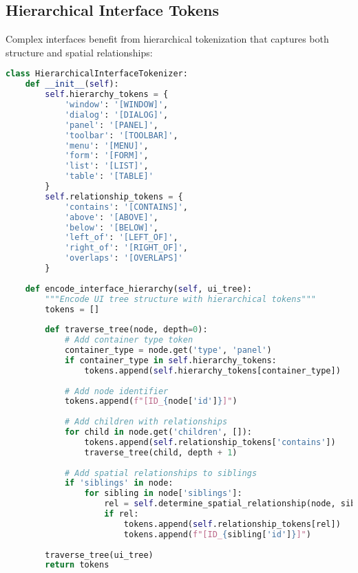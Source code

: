 \subsection{Hierarchical Interface Tokens}

Complex interfaces benefit from hierarchical tokenization that captures both structure and spatial relationships:

\begin{lstlisting}[language=Python, caption=Hierarchical interface tokenization]
class HierarchicalInterfaceTokenizer:
    def __init__(self):
        self.hierarchy_tokens = {
            'window': '[WINDOW]',
            'dialog': '[DIALOG]',
            'panel': '[PANEL]',
            'toolbar': '[TOOLBAR]',
            'menu': '[MENU]',
            'form': '[FORM]',
            'list': '[LIST]',
            'table': '[TABLE]'
        }
        self.relationship_tokens = {
            'contains': '[CONTAINS]',
            'above': '[ABOVE]',
            'below': '[BELOW]',
            'left_of': '[LEFT_OF]',
            'right_of': '[RIGHT_OF]',
            'overlaps': '[OVERLAPS]'
        }
    
    def encode_interface_hierarchy(self, ui_tree):
        """Encode UI tree structure with hierarchical tokens"""
        tokens = []
        
        def traverse_tree(node, depth=0):
            # Add container type token
            container_type = node.get('type', 'panel')
            if container_type in self.hierarchy_tokens:
                tokens.append(self.hierarchy_tokens[container_type])
            
            # Add node identifier
            tokens.append(f"[ID_{node['id']}]")
            
            # Add children with relationships
            for child in node.get('children', []):
                tokens.append(self.relationship_tokens['contains'])
                traverse_tree(child, depth + 1)
            
            # Add spatial relationships to siblings
            if 'siblings' in node:
                for sibling in node['siblings']:
                    rel = self.determine_spatial_relationship(node, sibling)
                    if rel:
                        tokens.append(self.relationship_tokens[rel])
                        tokens.append(f"[ID_{sibling['id']}]")
        
        traverse_tree(ui_tree)
        return tokens
    

\end{lstlisting}
